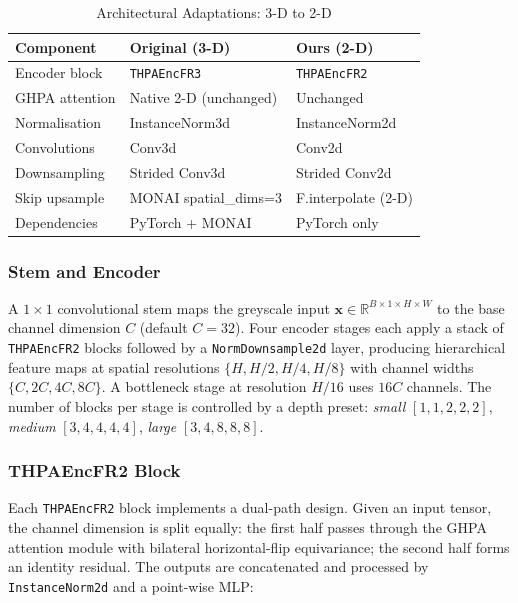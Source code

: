 \documentclass[conference]{IEEEtran}
\begin{document}
\begin{table}[h]
\centering
\caption{Architectural Adaptations: 3-D to 2-D}
\label{tab:adaptation}
\begin{tabular}{lll}
\toprule
\textbf{Component} & \textbf{Original (3-D)} & \textbf{Ours (2-D)} \\
\midrule
Encoder block      & \texttt{THPAEncFR3}    & \texttt{THPAEncFR2} \\
GHPA attention     & Native 2-D (unchanged) & Unchanged \\
Normalisation      & InstanceNorm3d         & InstanceNorm2d \\
Convolutions       & Conv3d                 & Conv2d \\
Downsampling       & Strided Conv3d         & Strided Conv2d \\
Skip upsample      & MONAI spatial\_dims=3  & F.interpolate (2-D) \\
Dependencies       & PyTorch + MONAI        & PyTorch only \\
\bottomrule
\end{tabular}
\end{table}

\subsubsection{Stem and Encoder}

A $1{\times}1$ convolutional stem maps the greyscale input
$\mathbf{x} \in \mathbb{R}^{B \times 1 \times H \times W}$ to the
base channel dimension $C$ (default $C{=}32$). Four encoder stages
each apply a stack of \texttt{THPAEncFR2} blocks followed by a
\texttt{NormDownsample2d} layer, producing hierarchical feature maps
at spatial resolutions $\{H, H/2, H/4, H/8\}$ with channel widths
$\{C, 2C, 4C, 8C\}$. A bottleneck stage at resolution $H/16$ uses
$16C$ channels. The number of blocks per stage is controlled by a
depth preset: \textit{small} $[1,1,2,2,2]$, \textit{medium}
$[3,4,4,4,4]$, \textit{large} $[3,4,8,8,8]$.

\subsubsection{THPAEncFR2 Block}

Each \texttt{THPAEncFR2} block implements a dual-path design. Given
an input tensor, the channel dimension is split equally: the first
half passes through the GHPA attention module with bilateral
horizontal-flip equivariance; the second half forms an identity
residual. The outputs are concatenated and processed by
\texttt{InstanceNorm2d} and a point-wise MLP:
\end{document}

